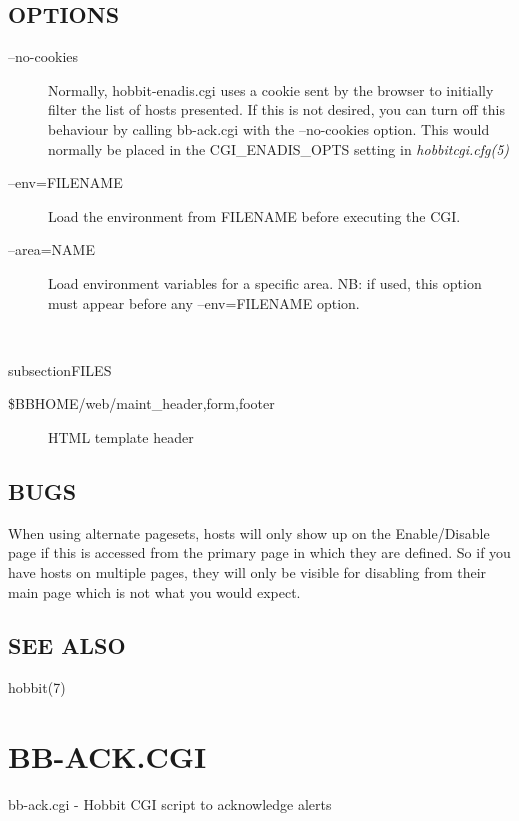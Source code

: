 \subsection{OPTIONS}
\begin{description}
\item[--no-cookies] Normally, hobbit-enadis.cgi uses a cookie sent by
  the browser to initially filter the list of hosts presented. If this
  is not desired, you can turn off this behaviour by calling
  bb-ack.cgi with the --no-cookies option. This would normally be
  placed in the CGI\_ENADIS\_OPTS setting in \emph{hobbitcgi.cfg(5)}



 

\item[--env=FILENAME] Load the environment from FILENAME before
  executing the CGI. 


 

\item[--area=NAME] Load environment variables for a specific area. NB:
  if used, this option must appear before any --env=FILENAME option. 

\end{description}
\

subsection{FILES}
\begin{description}
\item [\$BBHOME/web/maint\_{header,form,footer}] HTML template header 

 


\end{description}
\subsection{BUGS}
 When using alternate pagesets, hosts will only show up on the
 Enable/Disable page if this is accessed from the primary page in
 which they are defined. So if you have hosts on multiple pages, they
 will only be visible for disabling from their main page which is not
 what you would expect. 


 
\subsection{SEE ALSO}
hobbit(7) 

 
%
\newpage
\section{BB-ACK.CGI}
 bb-ack.cgi - Hobbit CGI script to acknowledge alerts \

